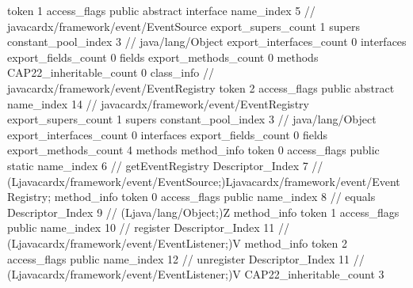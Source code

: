 {{{			token	1
			access_flags	public abstract interface
			name_index	5		// javacardx/framework/event/EventSource
			export_supers_count	1
			supers {
				constant_pool_index	3		// java/lang/Object
			}
			export_interfaces_count	0
			interfaces {
			}
			export_fields_count	0
			fields {
			}
			export_methods_count	0
			methods {
			}
			CAP22_inheritable_count	0
		}
		class_info {		// javacardx/framework/event/EventRegistry
			token	2
			access_flags	public abstract
			name_index	14		// javacardx/framework/event/EventRegistry
			export_supers_count	1
			supers {
				constant_pool_index	3		// java/lang/Object
			}
			export_interfaces_count	0
			interfaces {
			}
			export_fields_count	0
			fields {
			}
			export_methods_count	4
			methods {
				method_info {
					token	0
					access_flags	public static
					name_index	6		// getEventRegistry
					Descriptor_Index	7		// (Ljavacardx/framework/event/EventSource;)Ljavacardx/framework/event/EventRegistry;
				}
				method_info {
					token	0
					access_flags	public
					name_index	8		// equals
					Descriptor_Index	9		// (Ljava/lang/Object;)Z
				}
				method_info {
					token	1
					access_flags	public
					name_index	10		// register
					Descriptor_Index	11		// (Ljavacardx/framework/event/EventListener;)V
				}
				method_info {
					token	2
					access_flags	public
					name_index	12		// unregister
					Descriptor_Index	11		// (Ljavacardx/framework/event/EventListener;)V
				}
			}
			CAP22_inheritable_count	3
		}
	}
}

